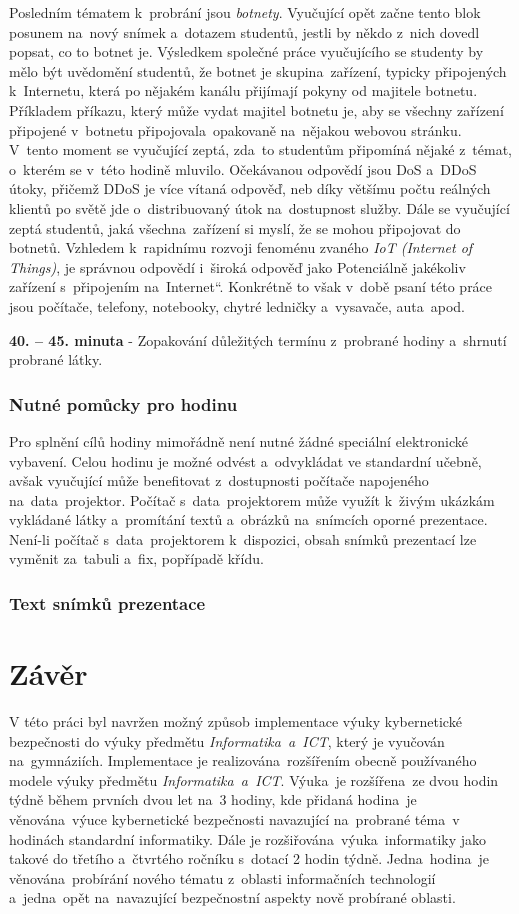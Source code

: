 \documentclass[a4paper, 12pt]{article}
\providecommand{\uv}[1]{\quotedblbase #1\textquotedblleft}
\begin{document}
Posledním tématem k~probrání jsou \textit{botnety}. Vyučující opět začne tento blok posunem na~nový snímek a~dotazem studentů, jestli by někdo z~nich dovedl popsat, co to botnet je. Výsledkem společné práce vyučujícího se studenty by mělo být uvědomění studentů, že botnet je skupina~zařízení, typicky připojených k~Internetu, která po nějakém kanálu přijímají pokyny od majitele botnetu. Příkladem příkazu, který může vydat majitel botnetu je, aby se všechny zařízení připojené v~botnetu připojovala~opakovaně na~nějakou webovou stránku. V~tento moment se vyučující zeptá, zda~to studentům připomíná nějaké z~témat, o~kterém se v~této hodině mluvilo. Očekávanou odpovědí jsou DoS a~DDoS útoky, přičemž DDoS je více vítaná odpověď, neb díky většímu počtu reálných klientů po světě jde o~distribuovaný útok na~dostupnost služby. Dále se vyučující zeptá studentů, jaká všechna~zařízení si myslí, že se mohou připojovat do botnetů. Vzhledem k~rapidnímu rozvoji fenoménu zvaného \textit{IoT (Internet of Things)}, je správnou odpovědí i~široká odpověď jako \uv{Potenciálně jakékoliv zařízení s~připojením na~Internet}. Konkrétně to však v~době psaní této práce jsou počítače, telefony, notebooky, chytré ledničky a~vysavače, auta~apod.

\textbf{40. -- 45. minuta} - Zopakování důležitých termínu z~probrané hodiny a~shrnutí probrané látky.

\subsubsection{Nutné pomůcky pro hodinu}
Pro splnění cílů hodiny mimořádně není nutné žádné speciální elektronické vybavení. Celou hodinu je možné odvést a~odvykládat ve standardní učebně, avšak vyučující může benefitovat z~dostupnosti počítače napojeného na~data~projektor. Počítač s~data~projektorem může využít k~živým ukázkám vykládané látky a~promítání textů a~obrázků na~snímcích oporné prezentace. Není-li počítač s~data~projektorem k~dispozici, obsah snímků prezentací lze vyměnit za~tabuli a~fix, popřípadě křídu.

\subsubsection{Text snímků prezentace}




\newpage
\section{Závěr}
V této práci byl navržen možný způsob implementace výuky kybernetické bezpečnosti do výuky předmětu \textit{Informatika~a~ICT}, který je vyučován na~gymnáziích. Implementace je realizována~rozšířením obecně používaného modele výuky předmětu \textit{Informatika~a~ICT}. Výuka~je rozšířena~ze dvou hodin týdně během prvních dvou let na~3 hodiny, kde přidaná hodina~je věnována~výuce kybernetické bezpečnosti navazující na~probrané téma~v hodinách standardní informatiky. Dále je rozšiřována~výuka~informatiky jako takové do třetího a~čtvrtého ročníku s~dotací 2 hodin týdně. Jedna~hodina~je věnována~probírání nového tématu z~oblasti informačních technologií a~jedna~opět na~navazující bezpečnostní aspekty nově probírané oblasti.
\end{document}
